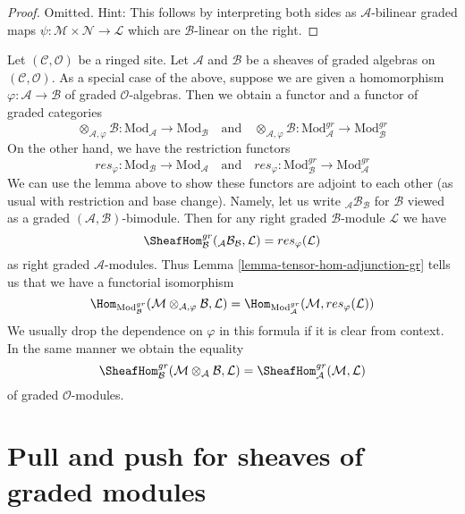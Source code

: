 \begin{proof}
Omitted. Hint: This follows by interpreting both sides as
$\mathcal{A}$-bilinear graded maps
$\psi : \mathcal{M} \times \mathcal{N} \to \mathcal{L}$
which are $\mathcal{B}$-linear on the right.
\end{proof}

\noindent
Let $(\mathcal{C}, \mathcal{O})$ be a ringed site. Let $\mathcal{A}$
and $\mathcal{B}$ be a sheaves of graded algebras on
$(\mathcal{C}, \mathcal{O})$.
As a special case of the above, suppose we are given
a homomorphism $\varphi : \mathcal{A} \to \mathcal{B}$
of graded $\mathcal{O}$-algebras. Then we obtain a functor
and a functor of graded categories
$$
\otimes_{\mathcal{A}, \varphi} \mathcal{B} :
\text{Mod}_\mathcal{A}
\longrightarrow
\text{Mod}_\mathcal{B}
\quad\text{and}\quad
\otimes_{\mathcal{A}, \varphi} \mathcal{B} :
\text{Mod}^{gr}_\mathcal{A}
\longrightarrow
\text{Mod}^{gr}_\mathcal{B}
$$
On the other hand, we have the restriction functors
$$
res_\varphi :
\text{Mod}_\mathcal{B}
\longrightarrow
\text{Mod}_\mathcal{A}
\quad\text{and}\quad
res_\varphi :
\text{Mod}^{gr}_\mathcal{B}
\longrightarrow
\text{Mod}^{gr}_\mathcal{A}
$$
We can use the lemma above to show these functors are adjoint to
each other (as usual with restriction and base change). Namely,
let us write ${}_\mathcal{A}\mathcal{B}_\mathcal{B}$ for
$\mathcal{B}$ viewed as a graded $(\mathcal{A}, \mathcal{B})$-bimodule.
Then for any right graded $\mathcal{B}$-module $\mathcal{L}$
we have
$$
\SheafHom_\mathcal{B}^{gr}({}_\mathcal{A}\mathcal{B}_\mathcal{B}, \mathcal{L})
= res_\varphi(\mathcal{L})
$$
as right graded $\mathcal{A}$-modules. Thus
Lemma \ref{lemma-tensor-hom-adjunction-gr}
tells us that we have a functorial isomorphism
$$
\Hom_{\text{Mod}_\mathcal{B}^{gr}}(
\mathcal{M} \otimes_{\mathcal{A}, \varphi} \mathcal{B}, \mathcal{L}) =
\Hom_{\text{Mod}_\mathcal{A}^{gr}}(
\mathcal{M}, res_\varphi(\mathcal{L}))
$$
We usually drop the dependence on $\varphi$ in this formula if it
is clear from context. In the same manner we obtain
the equality
$$
\SheafHom^{gr}_\mathcal{B}(
\mathcal{M} \otimes_\mathcal{A} \mathcal{B}, \mathcal{L}) =
\SheafHom_\mathcal{A}^{gr}(\mathcal{M}, \mathcal{L})
$$
of graded $\mathcal{O}$-modules.




\section{Pull and push for sheaves of graded modules}
\label{section-functoriality-graded}

